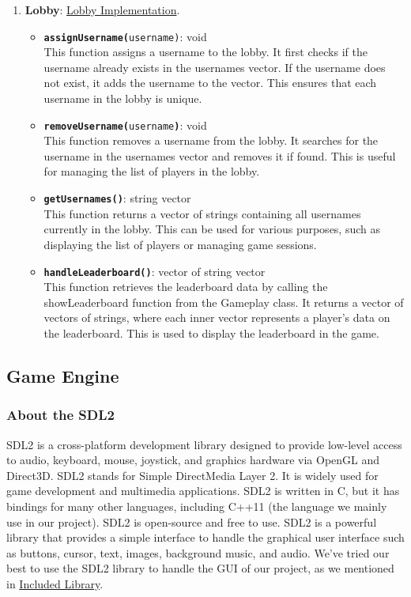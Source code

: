 \begin{enumerate}
    \item \textbf{Lobby}: \href{https://github.com/anhtri2407/Poker/blob/main/src/core/Lobby.cpp}{Lobby Implementation}.
    \begin{itemize}
        \item \texttt{\textbf{assignUsername(}username\textbf{})}: void \\
        This function assigns a username to the lobby. It first checks if the username already exists in the usernames vector. If the username does not exist, it adds the username to the vector. This ensures that each username in the lobby is unique.
        \item \texttt{\textbf{removeUsername(}username\textbf{)}}: void \\
        This function removes a username from the lobby. It searches for the username in the usernames vector and removes it if found. This is useful for managing the list of players in the lobby.
        \item \texttt{\textbf{getUsernames()}}: string vector \\
        This function returns a vector of strings containing all usernames currently in the lobby. This can be used for various purposes, such as displaying the list of players or managing game sessions.
        \item \texttt{\textbf{handleLeaderboard()}}: vector of string vector \\
         This function retrieves the leaderboard data by calling the showLeaderboard function from the Gameplay class. It returns a vector of vectors of strings, where each inner vector represents a player's data on the leaderboard. This is used to display the leaderboard in the game.
    \end{itemize}
\end{enumerate}

\subsection{Game Engine}
\label{subsec:game-engine}

\subsubsection{About the SDL2}
\label{subsubsec:about-the-sdl2}
\hspace{1cm} SDL2 is a cross-platform development library designed to provide low-level access to audio, keyboard, mouse, joystick, and graphics hardware via OpenGL and Direct3D. SDL2 stands for Simple DirectMedia Layer 2. It is widely used for game development and multimedia applications. SDL2 is written in C, but it has bindings for many other languages, including C++11 (the language we mainly use in our project). SDL2 is open-source and free to use. SDL2 is a powerful library that provides a simple interface to handle the graphical user interface such as buttons, cursor, text, images, background music, and audio. We've tried our best to use the SDL2 library to handle the GUI of our project, as we mentioned in \hyperref[subsec:included-library]{Included Library}.
\vspace{0.5cm}

